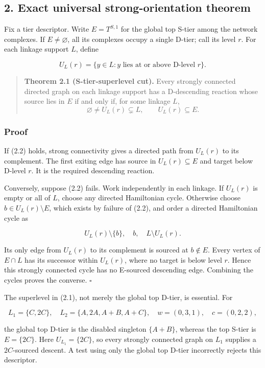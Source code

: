 \subsection{2. Exact universal strong-orientation
theorem}

Fix a tier descriptor. Write \(E=T^{S,1}\) for the global top S-tier
among the network complexes. If \(E\ne\varnothing\), all its complexes
occupy a single D-tier; call its level \(r\). For each linkage support
\(L\), define

\[
 U_L(r)=\{y\in L:y\text{ lies at or above D-level }r\}.
 \tag{2.1}
\]

\begin{quote}
\textbf{Theorem 2.1 (S-tier-superlevel cut).} Every strongly connected
directed graph on each linkage support has a D-descending reaction whose
source lies in \(E\) if and only if, for some linkage \(L\), \[
  \varnothing\ne U_L(r)\subsetneq L,
  \qquad U_L(r)\subseteq E.
  \tag{2.2}
\]
\end{quote}

\subsubsection{Proof}

If (2.2) holds, strong connectivity gives a directed path from
\(U_L(r)\) to its complement. The first exiting edge has source in
\(U_L(r)\subseteq E\) and target below D-level \(r\). It is the required
descending reaction.

Conversely, suppose (2.2) fails. Work independently in each linkage. If
\(U_L(r)\) is empty or all of \(L\), choose any directed Hamiltonian
cycle. Otherwise choose \(b\in U_L(r)\setminus E\), which exists by
failure of (2.2), and order a directed Hamiltonian cycle as

\[
 U_L(r)\setminus\{b\},\quad b,\quad L\setminus U_L(r).
 \tag{2.3}
\]

Its only edge from \(U_L(r)\) to its complement is sourced at
\(b\notin E\). Every vertex of \(E\cap L\) has its successor within
\(U_L(r)\), where no target is below level \(r\). Hence this strongly
connected cycle has no E-sourced descending edge. Combining the cycles
proves the converse. \(\square\)

The superlevel in (2.1), not merely the global top D-tier, is essential.
For

\[
 L_1=\{C,2C\},\quad L_2=\{A,2A,A+B,A+C\},\quad
 w=(0,3,1),\quad c=(0,2,2),
\]

the global top D-tier is the disabled singleton \(\{A+B\}\), whereas the
top S-tier is \(E=\{2C\}\). Here \(U_{L_1}=\{2C\}\), so every strongly
connected graph on \(L_1\) supplies a \(2C\)-sourced descent. A test
using only the global top D-tier incorrectly rejects this descriptor.

